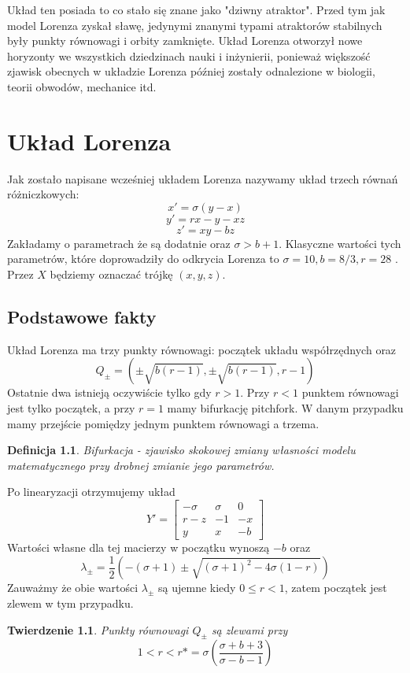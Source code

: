 \documentclass[12pt]{report}
\newtheorem{theorem}{Twierdzenie}
\newtheorem{definition}{Definicja}
\begin{document}
	\par Układ ten posiada to co stało się znane jako "dziwny atraktor". Przed tym jak model Lorenza zyskał sławę, jedynymi znanymi typami atraktorów stabilnych były punkty równowagi i orbity zamknięte. Układ Lorenza otworzył nowe horyzonty we wszystkich dziedzinach nauki i inżynierii, ponieważ większość zjawisk obecnych w układzie Lorenza później zostały odnalezione w biologii, teorii obwodów, mechanice itd. \cite{HSD}

\chapter{Układ Lorenza}
	\par Jak zostało napisane wcześniej układem Lorenza nazywamy układ trzech równań różniczkowych:
		\[ x' = \sigma (y - x) \]
		\[ y' = rx - y - xz \]
		\[ z' = xy - bz \]
	Zakładamy o parametrach że są dodatnie oraz $\sigma > b + 1$. Klasyczne wartości tych parametrów, które doprowadziły do odkrycia Lorenza to $\sigma = 10, b = 8/3, r = 28$ \cite{Lorenz}. Przez $X$ będziemy oznaczać trójkę $(x, y, z)$.

	\section{Podstawowe fakty}
	\par Układ Lorenza ma trzy punkty równowagi: początek układu współrzędnych oraz
		\[ Q_{\pm} = (\pm \sqrt{b(r - 1)}, \pm \sqrt{b(r - 1)}, r - 1) \]
	Ostatnie dwa istnieją oczywiście tylko gdy $r > 1$. Przy $r < 1$ punktem równowagi jest tylko początek, a przy $r = 1$ mamy bifurkację pitchfork. W danym przypadku mamy przejście pomiędzy jednym punktem równowagi a trzema.
	\begin{definition}
		Bifurkacja - zjawisko skokowej zmiany własności modelu matematycznego przy drobnej zmianie jego parametrów.
	\end{definition}
	
	\par Po linearyzacji otrzymujemy układ
		\[ Y' = \begin{bmatrix}
					-\sigma & \sigma & 0 \\
					r-z & -1 & -x \\
					y & x & -b
				\end{bmatrix}
		\]
	Wartości własne dla tej macierzy w początku wynoszą $-b$ oraz
		\[ \lambda_{\pm} = \frac{1}{2} (-(\sigma + 1) \pm \sqrt{(\sigma + 1)^2 - 4\sigma (1 - r)}) \]
	Zauważmy że obie wartości $\lambda_{\pm}$ są ujemne kiedy $0 \le r < 1$, zatem początek jest zlewem w tym przypadku.
	\begin{theorem}
		Punkty równowagi $Q_{\pm}$ są zlewami przy
		\[ 1 < r < r* = \sigma (\frac{\sigma + b + 3}{\sigma - b - 1}) \]
	\end{theorem}
	
\end{document}
